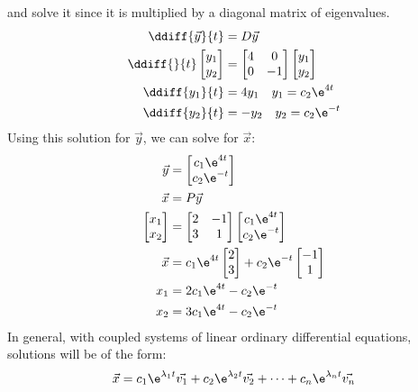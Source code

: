 \documentclass{math}
\begin{document}
and solve it since it is multiplied by a diagonal matrix of eigenvalues.
\begin{align*}
  \ddiff{\vec{y}}{t} &= D\vec{y} \\
  \ddiff{}{t}\begin{bmatrix}y_1 \\ y_2\end{bmatrix} &= \begin{bmatrix}
    4 & 0 \\
    0 & -1
  \end{bmatrix}\begin{bmatrix}y_1 \\ y_2\end{bmatrix} \\
  \ddiff{y_1}{t} &= 4y_1 \quad y_1 = c_2\e^{4t} \\
  \ddiff{y_2}{t} &= -y_2 \quad y_2 = c_2\e^{-t}
\end{align*}
Using this solution for \( \vec{y} \), we can solve for \( \vec{x} \):
\begin{align*}
  \vec{y} &= \begin{bmatrix}
    c_1\e^{4t} \\ c_2\e^{-t}
  \end{bmatrix} \\
  \vec{x} &= P\vec{y} \\
  \begin{bmatrix}x_1 \\ x_2\end{bmatrix} &= \begin{bmatrix}
    2 & -1 \\
    3 & 1
  \end{bmatrix}\begin{bmatrix}c_1\e^{4t} \\ c_2\e^{-t}\end{bmatrix} \\
  \vec{x} &= c_1\e^{4t}\begin{bmatrix}2 \\ 3\end{bmatrix}+
    c_2\e^{-t}\begin{bmatrix}-1 \\ 1\end{bmatrix} \\
  x_1 &= 2c_1\e^{4t}-c_2\e^{-t} \\
  x_2 &= 3c_1\e^{4t}-c_2\e^{-t}
\end{align*}
In general, with coupled systems of linear ordinary differential equations,
solutions will be of the form:
\[ \vec{x} = c_1\e^{\lambda_1t}\vec{v_1}+c_2\e^{\lambda_2t}\vec{v_2}+\dots+
  c_n\e^{\lambda_nt}\vec{v_n} \]
\end{document}

